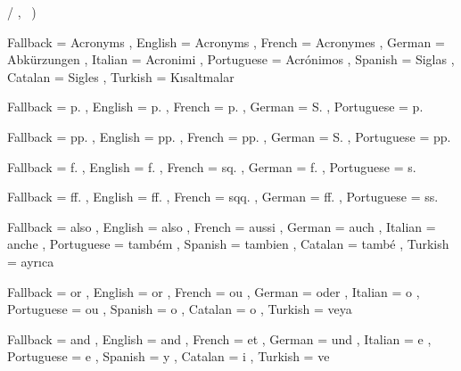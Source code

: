   {
    \acroheading
    \acropreamble
    \acronopagerange
    \acronymsmapF
      {
          {   { /  } }
          {}{}
          {
              {   {,~} }
             {  }
             {) }
          }
          { \acropages {} {} }
          {}
      }
      { \AcroRerun }
  }

  {
    Fallback   = Acronyms ,
    English    = Acronyms ,
    French     = Acronymes ,
    German     = Abk\"urzungen ,
    Italian    = Acronimi ,
    Portuguese = Acr\'onimos ,
    Spanish    = Siglas ,
    Catalan    = Sigles ,
    Turkish    = K\i saltmalar
  }

  {
    Fallback   = p. ,
    English    = p. ,
    French     = p. ,
    German     = S. ,
    Portuguese = p.
  }

  {
    Fallback   = pp. ,
    English    = pp. ,
    French     = pp. ,
    German     = S. ,
    Portuguese = pp.
  }

  {
    Fallback   = f. ,
    English    = f. ,
    French     = sq. ,
    German     = f. ,
    Portuguese = s.
  }

  {
    Fallback   = ff. ,
    English    = ff. ,
    French     = sqq. ,
    German     = ff. ,
    Portuguese = ss.
  }

  {
    Fallback   = also ,
    English    = also ,
    French     = aussi ,
    German     = auch ,
    Italian    = anche ,
    Portuguese = tamb\'{e}m ,
    Spanish    = tambien ,
    Catalan    = tamb\'{e} ,
    Turkish    = ayr\i ca
  }

  {
    Fallback   = or ,
    English    = or ,
    French     = ou ,
    German     = oder ,
    Italian    = o ,
    Portuguese = ou ,
    Spanish    = o ,
    Catalan    = o ,
    Turkish    = veya
  }

  {
    Fallback   = and ,
    English    = and ,
    French     = et ,
    German     = und ,
    Italian    = e ,
    Portuguese = e ,
    Spanish    = y ,
    Catalan    = i ,
    Turkish    = ve
  }

\AcroModuleEnd
